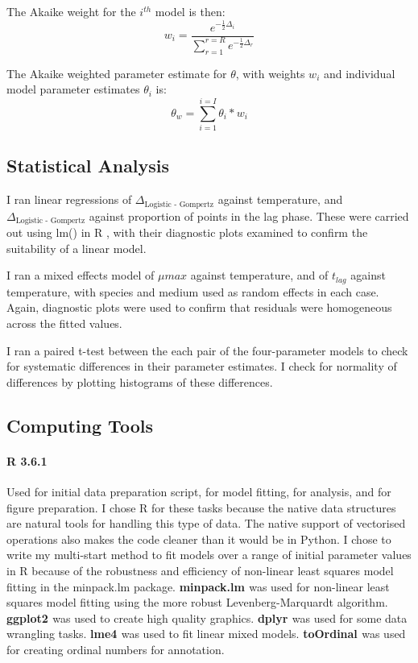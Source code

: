 \documentclass[11pt, a4paper]{article}
\begin{document}
\begin{linenumbers}
The Akaike weight for the $i^{th}$ model is then:
\[ w_i = \frac{e^{-\frac{1}{2}\Delta_i }} { \sum_{r = 1}^{r = R}  e^{- \frac{1}{2}\Delta_r }}\]

The Akaike weighted parameter estimate for $\theta$, with weights $w_i$ and individual model parameter estimates $\theta_i$ is:
\[\theta_w = \sum_{i = 1}^{i = I}\theta_i * w_i\]


\subsection{Statistical Analysis}

I ran linear regressions of $\Delta_{\text{Logistic - Gompertz}}$ against temperature, and $\Delta_{\text{Logistic - Gompertz}}$ against proportion of points in the lag phase. These were carried out using lm() in R \cite{R}, with their diagnostic plots examined to confirm the suitability of a linear model.

I ran a mixed effects model of $\mu{max}$ against temperature, and of $t_{lag}$ against temperature, with species and medium used as random effects in each case. Again, diagnostic plots were used to confirm that residuals were homogeneous across the fitted values.

I ran a paired t-test between the each pair of the four-parameter models to check for systematic differences in their parameter estimates. I check for normality of differences by plotting histograms of these differences.  

\subsection{Computing Tools}
\paragraph{R 3.6.1 \cite{R}} Used for initial data preparation script, for model fitting, for analysis, and for figure preparation. I chose R for these tasks because the native data structures are natural tools for handling this type of data. The native support of vectorised operations also makes the code cleaner than it would be in Python. I chose to write my multi-start method to fit models over a range of initial parameter values in R because of the robustness and efficiency of non-linear least squares model fitting in the minpack.lm package. \textbf{minpack.lm \cite{minpack}} was used for non-linear least squares model fitting using the more robust Levenberg-Marquardt algorithm. \textbf{ggplot2 \cite{gg}} was used to create high quality graphics. \textbf{dplyr \cite{dplyr}} was used for some data wrangling tasks. \textbf{lme4 \cite{lme4}} was used to fit linear mixed models. \textbf{toOrdinal \cite{tO}} was used for creating ordinal numbers for annotation.


\end{linenumbers}
\end{document}
